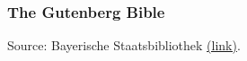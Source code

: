 \begin{frame}
\frametitle{The Gutenberg Bible}
\begin{center}
\vspace{-1em}
\end{center}
\vspace{-1em}
\hfill\footnotesize{Source: Bayerische Staatsbibliothek 
\href{http://daten.digitale-sammlungen.de/bsb00004647/image_13}{(link)}.}
\end{frame}



